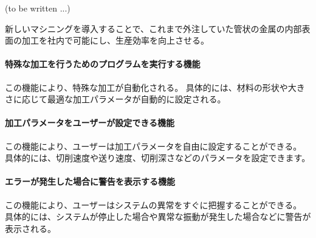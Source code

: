 (to be written ...)



新しいマシニングを導入することで、これまで外注していた管状の金属の内部表面の加工を社内で可能にし、生産効率を向上させる。



\paragraph*{特殊な加工を行うためのプログラムを実行する機能}
この機能により、特殊な加工が自動化される。
具体的には、材料の形状や大きさに応じて最適な加工パラメータが自動的に設定される。

\paragraph*{加工パラメータをユーザーが設定できる機能}
この機能により、ユーザーは加工パラメータを自由に設定することができる。
具体的には、切削速度や送り速度、切削深さなどのパラメータを設定できます。

\paragraph*{エラーが発生した場合に警告を表示する機能}
この機能により、ユーザーはシステムの異常をすぐに把握することができる。
具体的には、システムが停止した場合や異常な振動が発生した場合などに警告が表示される。










